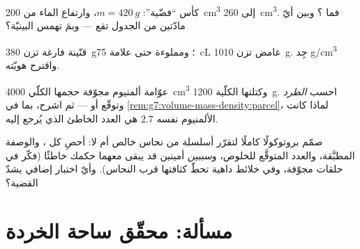 \begin{exercise}[$\star\star$]\label{exo:g7:volume-mass-density:9}
كأس ``فضّية'': $m = \qty{420}{g}$، وارتفاع الماء من
\qty{200}{cm^3} إلى \qty{260}{cm^3}. فما ؟ وبين أيّ
مادّتين من الجدول تقع --- وبمَ تهمس البينيّة؟
\end{exercise}

\begin{exercise}[$\star\star$]\label{exo:g7:volume-mass-density:10}
قنّينة فارغة تزن \qty{380}{g}؛ ومملوءة حتى علامة \qty{75}{cL}
 غامض تزن \qty{1010}{g}. جِد    \unit{g/cm^3}
واقترح هويّته.
\end{exercise}

\begin{exercise}[$\star\star$]\label{exo:g7:volume-mass-density:11}
عوّامة ألمنيوم مجوّفة حجمها الكلّي \qty{4000}{cm^3} وكتلتها
الكلّية \qty{1200}{g}. احسب  \emph{الطرد} وتوقّع  أو
 --- ثم اشرح، بما في
\cref{rem:g7:volume-mass-density:parcel}، لماذا كانت 
الألمنيوم نفسه $2.7$ هي العدد الخاطئ الذي يُرجع إليه.
\end{exercise}

\begin{exercise}[$\star\star\star$]\label{exo:g7:volume-mass-density:12}
صمّم بروتوكولًا كاملًا لتقرّر أسلسلة من نحاس خالص أم لا: أحصِ
كل ، والوصفة المطبَّقة، والعدد المتوقَّع للخلوص،
و\emph{سببين} أمينين قد يبقى معهما حكمك خاطئًا (فكّر في حلقات
مجوّفة، وفي خلائط داهية تحطّ كثافتها قرب  النحاس). وأيّ
اختبار إضافي يشدّ القضية؟
\end{exercise}

\section{مسألة: محقّق ساحة الخردة}

